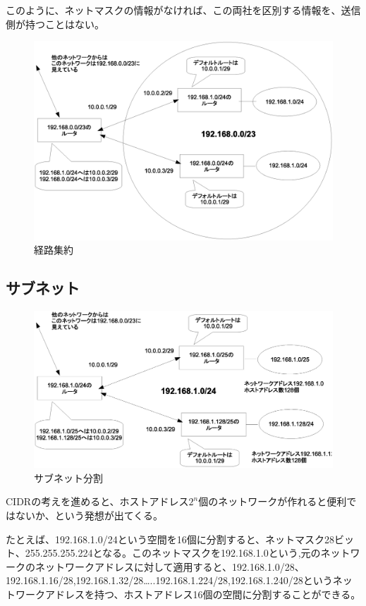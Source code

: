 このように、ネットマスクの情報がなければ、この両社を区別する情報を、送信側が持つことはない。

\begin{figure}[htbp]
	\includegraphics[width=12cm,clip]{draw/cidr.eps}
	\caption{経路集約}
	\label{fig:cidr}
\end{figure}

\subsection{サブネット}

\begin{figure}[htbp]
	\includegraphics[width=12cm,clip]{draw/subbne.eps}
	\caption{サブネット分割}
	\label{fig:subnet}
\end{figure}

CIDRの考えを進めると、ホストアドレス$2^{n}$個のネットワークが作れると便利ではないか、という発想が出てくる。

たとえば、192.168.1.0/24という空間を16個に分割すると、ネットマスク28ビット、255.255.255.224となる。このネットマスクを192.168.1.0という,元のネットワークのネットワークアドレスに対して適用すると、192.168.1.0/28、 192.168.1.16/28,192.168.1.32/28…..192.168.1.224/28,192.168.1.240/28というネットワークアドレスを持つ、ホストアドレス16個の空間に分割することができる。

